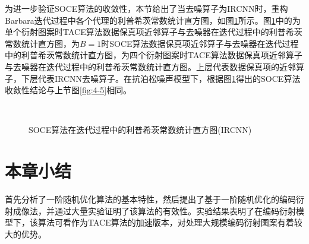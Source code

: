 为进一步验证SOCE算法的收敛性，本节给出了当去噪算子为IRCNN时，重构Barbara迭代过程中各个代理的利普希茨常数统计直方图，如图\ref{fig:4-7}所示。图\ref{fig:4-7}中的为单个衍射图案时TACE算法数据保真项近邻算子与去噪器在迭代过程中的利普希茨常数统计直方图，为$B=1$时SOCE算法数据保真项近邻算子与去噪器在迭代过程中的利普希茨常数统计直方图，为四个衍射图案时TACE算法数据保真项近邻算子与去噪器在迭代过程中的利普希茨常数统计直方图。上层代表数据保真项的近邻算子，下层代表IRCNN去噪算子。在抗泊松噪声模型下，根据图\ref{fig:4-7}得出的SOCE算法收敛性结论与上节图\ref{fig:4-5}相同。
\begin{figure}[!htbp]
	\centering
	\subfigure[fix 1]{
		\label{subfigure:4-2-1}
		\begin{minipage}[t]{0.2\linewidth}
			\centering
			\texttt{[image: 4-7-1]}\\
			\texttt{[image: 4-7-2]}
		\end{minipage}
	}
	\subfigure[B=1]{
		\label{subfigure:4-2-2}
		\begin{minipage}[t]{0.2\linewidth}
			\centering
			\texttt{[image: 4-7-3]}\\
			\texttt{[image: 4-7-4]}
		\end{minipage}
	}
	\subfigure[fix 4]{
		\label{subfigure:4-2-3}
		\begin{minipage}[t]{0.2\linewidth}
			\centering
			\texttt{[image: 4-7-5]}\\
			\texttt{[image: 4-7-6]}
		\end{minipage}
	}
	\caption{SOCE算法在迭代过程中的利普希茨常数统计直方图(IRCNN)} 
	\label{fig:4-7}  
\end{figure}

\section{本章小结}
首先分析了一阶随机优化算法的基本特性，然后提出了基于一阶随机优化的编码衍射成像法，并通过大量实验证明了该算法的有效性。实验结果表明了在编码衍射模型下，该算法可看作为TACE算法的加速版本，对处理大规模编码衍射图案有着较大的优势。